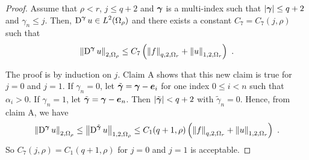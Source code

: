 \begin{proof}
 Assume that $\rho<r$, $j\leq q+2$ and
${\bm{\gamma}}$ is a multi-index such that $|{\bm{\gamma}}|\leq q+2$ and
$\gamma_n \leq j$.  Then,
$\displaystyle \operatorname{D}^{{\bm{\gamma}}} u \in L^2(\Omega_\rho)$ and there
exists a constant $C_7=C_7(j,\rho)$ such that
\begin{equation} \label{ell_claim2a}
\left\|\operatorname{D}^{{\bm{\gamma}}} u \right\|_{2,\Omega_\rho} \leq C_7 \left(
\left\|f\right\|_{q,2,\Omega_r} + \left\|u\right\|_{1,2,\Omega_r} \right) \ .
\end{equation}

The proof is by induction on $j$.  Claim A shows
that this new claim is true for $j=0$ and $j=1$.  If $\gamma_n=0$, let
$\tilde{{\bm{\gamma}}} = {\bm{\gamma}} - {\bm{e}}_i$ for one index $0\leq i <n$
such that $\alpha_i>0$.  If $\gamma_n=1$, let
$\tilde{{\bm{\gamma}}} = {\bm{\gamma}} - {\bm{e}}_n$.
Then $|\tilde{{\bm{\gamma}}}|<q+2$ with $\tilde{\gamma}_n =0$.  Hence, from
claim A, we have
\[
\left\|\operatorname{D}^{{\bm{\gamma}}} u \right\|_{2,\Omega_\rho}
\leq \left\|\operatorname{D}^{\tilde{{\bm{\gamma}}}} u \right\|_{1,2,\Omega_\rho}
\leq C_1(q+1,\rho) \left( \left\|f\right\|_{q,2,\Omega_r}
+ \left\|u\right\|_{1,2,\Omega_r} \right) \ .
\]
So $C_7(j,\rho) = C_1(q+1,\rho)$ for $j=0$ and $j=1$ is acceptable. 


\end{proof}
